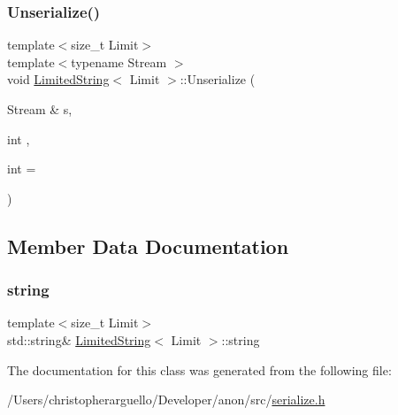 \mbox{\label{class_limited_string_a21ec9b742da8f8ff7b9a8b89131f943b}} 
\subsubsection{\texorpdfstring{Unserialize()}{Unserialize()}}
{\footnotesize\ttfamily template$<$size\+\_\+t Limit$>$ \\
template$<$typename Stream $>$ \\
void \mbox{\hyperlink{class_limited_string}{Limited\+String}}$<$ Limit $>$\+::Unserialize (\begin{DoxyParamCaption}\item[{Stream \&}]{s,  }\item[{int}]{,  }\item[{int}]{ = {} }\end{DoxyParamCaption})\hspace{0.3cm}{\ttfamily [inline]}}



\subsection{Member Data Documentation}
\mbox{\label{class_limited_string_a3f1d004f4632f7b2fda1a5a5afc266f7}} 
\subsubsection{\texorpdfstring{string}{string}}
{\footnotesize\ttfamily template$<$size\+\_\+t Limit$>$ \\
std\+::string\& \mbox{\hyperlink{class_limited_string}{Limited\+String}}$<$ Limit $>$\+::string\hspace{0.3cm}{\ttfamily [protected]}}



The documentation for this class was generated from the following file\+:\begin{DoxyCompactItemize}
\item 
/\+Users/christopherarguello/\+Developer/anon/src/\mbox{\hyperlink{serialize_8h}{serialize.\+h}}\end{DoxyCompactItemize}

